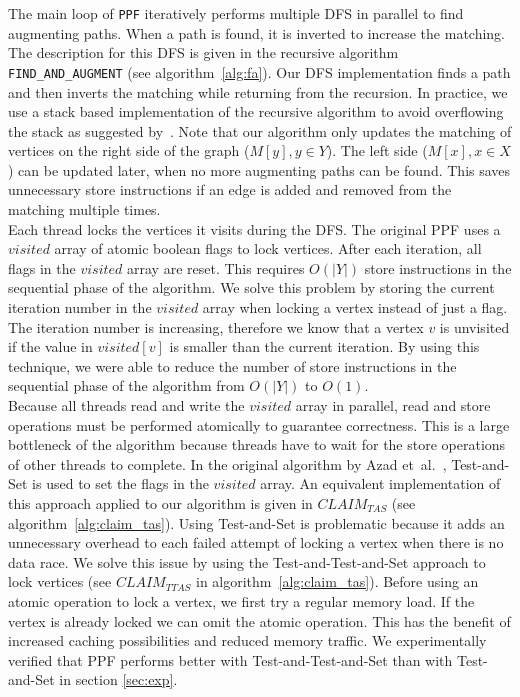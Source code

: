 \documentclass[letterpaper]{article}
\begin{document}
The main loop of \texttt{PPF} iteratively performs multiple DFS in parallel to find augmenting paths. 
When a path is found, it is inverted to increase the matching.
The description for this DFS is given in the recursive algorithm \texttt{FIND\_AND\_AUGMENT} (see algorithm~\ref{alg:fa}). 
Our DFS implementation finds a path and then inverts the matching while returning from the recursion. 
In practice, we use a stack based implementation of the recursive algorithm to avoid overflowing the stack as suggested by~\cite{Azad:2012}. 
Note that our algorithm only updates the matching of vertices on the right side of the graph ($M[y], y \in Y$). 
The left side ($M[x], x \in X$) can be updated later, when no more augmenting paths can be found. 
This saves unnecessary store instructions if an edge is added and removed from the matching multiple times.\\

Each thread locks the vertices it visits during the DFS. The original PPF uses a $visited$ array of atomic boolean flags to lock vertices. 
After each iteration, all flags in the $visited$ array are reset. This requires $O(|Y|)$ store instructions in the sequential phase of the algorithm. 
We solve this problem by storing the current iteration number in the $visited$ array when locking a vertex instead of just a flag. The iteration number is increasing, 
therefore we know that a vertex $v$ is unvisited if the value in $visited[v]$ is smaller than the current iteration. 
By using this technique, we were able to reduce the number of store instructions in the sequential phase of the algorithm from $O(|Y|)$ to $O(1)$.\\

Because all threads read and write the $visited$ array in parallel, read and store operations must be performed atomically to guarantee correctness. 
This is a large bottleneck of the algorithm because threads have to wait for the store operations of other threads to complete. 
In the original algorithm by Azad et\ al.~\cite{Azad:2012}, Test-and-Set is used to set the flags in the $visited$ array. 
An equivalent implementation of this approach applied to our algorithm is given in \texttt{$CLAIM_{TAS}$} (see algorithm~\ref{alg:claim_tas}). 
Using Test-and-Set is problematic because it adds an unnecessary overhead to each failed attempt of locking a vertex when there is no data race. 
We solve this issue by using the Test-and-Test-and-Set approach to lock vertices (see \texttt{$CLAIM_{TTAS}$} in algorithm~\ref{alg:claim_tas}).
Before using an atomic operation to lock a vertex, we first try a regular memory load. If the vertex is already locked we can omit the atomic operation. 
This has the benefit of increased caching possibilities and reduced memory traffic. 
We experimentally verified that PPF performs better with Test-and-Test-and-Set than with Test-and-Set in section \ref{sec:exp}.
\end{document}
